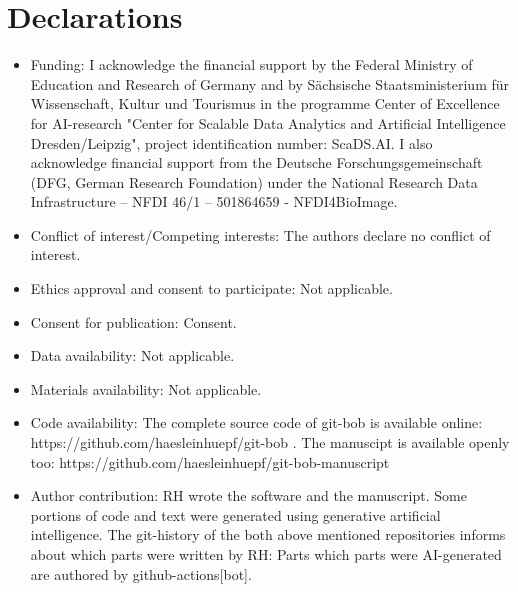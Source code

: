\documentclass[sn-mathphys-num]{sn-jnl}%
\theoremstyle{thmstyleone}%
\theoremstyle{thmstyletwo}%
\theoremstyle{thmstylethree}%
\begin{document}
\section*{Declarations}

\begin{itemize}
\item Funding: I acknowledge the financial support by the Federal Ministry of Education and Research of Germany and by Sächsische Staatsministerium für Wissenschaft, Kultur und Tourismus in the programme Center of Excellence for AI-research "Center for Scalable Data Analytics and Artificial Intelligence Dresden/Leipzig", project identification number: ScaDS.AI. I also acknowledge financial support from the Deutsche Forschungsgemeinschaft (DFG, German Research Foundation) under the National Research Data Infrastructure – NFDI 46/1 – 501864659 - NFDI4BioImage.
\item Conflict of interest/Competing interests: The authors declare no conflict of interest.
\item Ethics approval and consent to participate: Not applicable.
\item Consent for publication: Consent.
\item Data availability: Not applicable.
\item Materials availability: Not applicable.
\item Code availability: The complete source code of git-bob is available online: https://github.com/haesleinhuepf/git-bob . The manuscipt is available openly too: https://github.com/haesleinhuepf/git-bob-manuscript
\item Author contribution: RH wrote the software and the manuscript. Some portions of code and text were generated using generative artificial intelligence. The git-history of the both above mentioned repositories informs about which parts were written by RH: Parts which parts were AI-generated are authored by github-actions[bot].
\end{itemize}

\noindent

\bigskip
\end{document}
